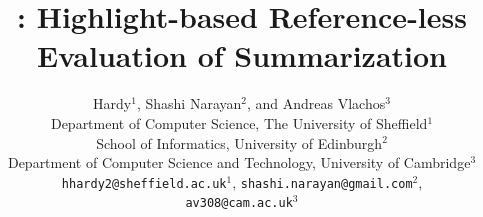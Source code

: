 \documentclass[11pt,a4paper]{article}
\title{\highres: Highlight-based Reference-less Evaluation of Summarization}
\author{Hardy$^1$, Shashi Narayan$^2$, \textnormal{and} Andreas Vlachos$^3$ \\
  Department of Computer Science, The University of Sheffield$^{1}$ \\
  School of Informatics, University of Edinburgh$^{2}$\\
  Department of Computer Science and Technology, University of Cambridge$^{3}$ \\
  \texttt{hhardy2@sheffield.ac.uk}$^1$, \texttt{shashi.narayan@gmail.com}$^2$, \\ \texttt{av308@cam.ac.uk}$^3$ \\}
\date{}
\begin{document}
\maketitle
\begin{abstract}
  
  

\end{abstract}
\end{document}
